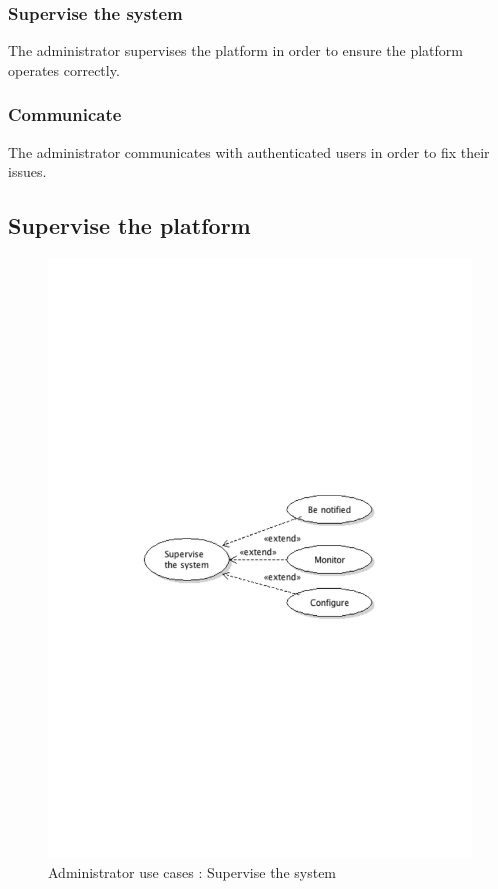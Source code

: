 		\subsubsection{Supervise the system}
			The administrator supervises the platform in order to ensure the platform operates correctly.
		\subsubsection{Communicate}
			The administrator communicates with authenticated users in order to fix their issues.
	\subsection{Supervise the platform}
		\begin{figure}[ht]
			\begin{center}
				\includegraphics[width=\textwidth, trim=2cm 12cm 2cm 12cm]{UML_figure/use_cases/administrator/UC_Administrator_Supervise.pdf}
				\caption{Administrator use cases : Supervise the system}
			\end{center}
		\end{figure}
